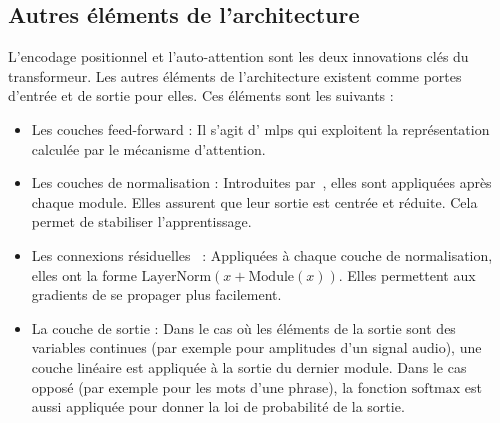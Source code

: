 \subsection{Autres éléments de l'architecture}

L'encodage positionnel et l'auto-attention sont les deux innovations clés du transformeur.
Les autres éléments de l'architecture existent comme portes d'entrée et de sortie pour elles.
Ces éléments sont les suivants :
\begin{itemize}
    \item Les couches \foreignlanguage{english}{feed-forward} :
          Il s'agit d' \glspl{mlp} qui exploitent la représentation calculée par le mécanisme d'attention.
    \item Les couches de normalisation :
          Introduites par~\cite{Ba_Kiros_Hinton_2016}, elles sont appliquées après chaque module.
          Elles assurent que leur sortie est centrée et réduite.
          Cela permet de stabiliser l'apprentissage.
    \item Les connexions résiduelles~\cite{He_Zhang_Ren_Sun_2016} :
          Appliquées à chaque couche de normalisation, elles ont la forme 
          \(\mathrm{LayerNorm}\left(x + \mathrm{Module}(x)\right)\).
          Elles permettent aux gradients de se propager plus facilement.
    \item La couche de sortie :
          Dans le cas où les éléments de la sortie sont des variables continues 
          (par exemple pour amplitudes d'un signal audio),
          une couche linéaire est appliquée à la sortie du dernier module.
          Dans le cas opposé (par exemple pour les mots d'une phrase),
          la fonction \(\mathrm{softmax}\) est aussi appliquée pour donner la loi de probabilité de la sortie.
\end{itemize}